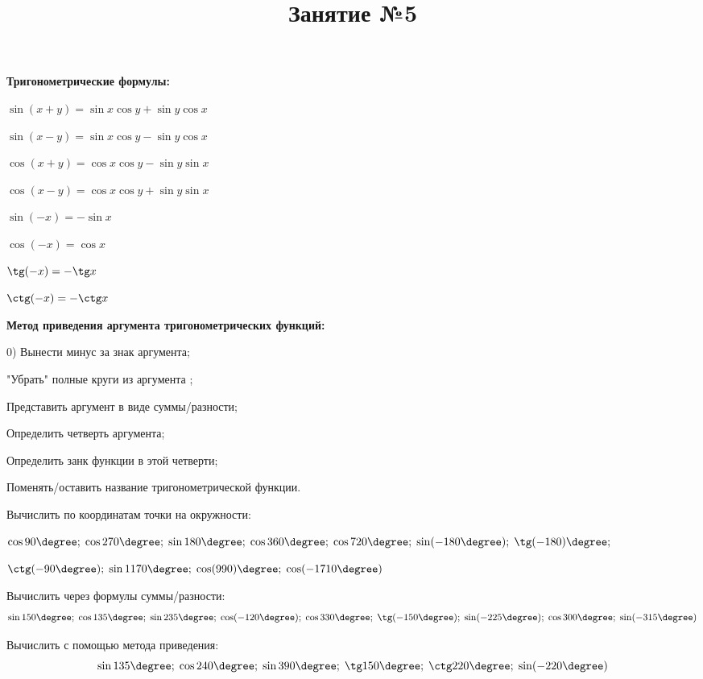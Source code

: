 \newpage
\title{Занятие №5}
\begin{listofex}
	\item \textbf{Тригонометрические формулы:}
	\begin{enumcols}[itemcolumns=2]
		\item \( \sin(x+y)=\sin x\cos y + \sin y \cos x \)
		\item \( \sin(x-y)=\sin x\cos y - \sin y \cos x \)
		\item \( \cos(x+y)=\cos x\cos y - \sin y \sin x \)
		\item \( \cos(x-y)=\cos x\cos y + \sin y \sin x \)
		\item \( \sin(-x)=-\sin x \)
		\item \( \cos(-x)=\cos x \)
		\item \( \tg(-x)=-\tg x \)
		\item \( \ctg(-x)=-\ctg x \)
	\end{enumcols}
	\item \textbf{Метод приведения аргумента тригонометрических функций:}
	\begin{enumcols}[itemcolumns=1]
		\item[0)] Вынести минус за знак аргумента;
		\item "Убрать" полные круги из аргумента ;
		\item Представить аргумент в виде суммы/разности;
		\item Определить четверть аргумента;
		\item Определить занк функции в этой четверти;
		\item Поменять/оставить название тригонометрической функции.
	\end{enumcols}
	\item Вычислить по координатам точки на окружности:
	\begin{enumcols}[itemcolumns=1]
		\item \( \cos90\degree;\;\cos270\degree;\;\sin 180\degree;\;\cos360\degree;\;\cos720\degree;\;\sin(-180\degree);\;\tg(-180)\degree; \)
		\item \( \ctg(-90\degree);\;\sin1170\degree;\;\cos(990)\degree;\;\cos(-1710\degree) \)
	\end{enumcols}
	\item Вычислить через формулы суммы/разности:
	\[ \sin150\degree;\;\cos135\degree;\;\sin235\degree;\;\cos(-120\degree);\;\cos330\degree;\;\tg(-150\degree);\;\sin(-225\degree);\;\cos300\degree;\;\sin(-315\degree) \]
	\item Вычислить с помощью метода приведения:
	\[ \sin135\degree;\;\cos240\degree;\;\sin390\degree;\;\tg150\degree;\;\ctg220\degree;\;\sin(-220\degree) \]

\end{listofex}
